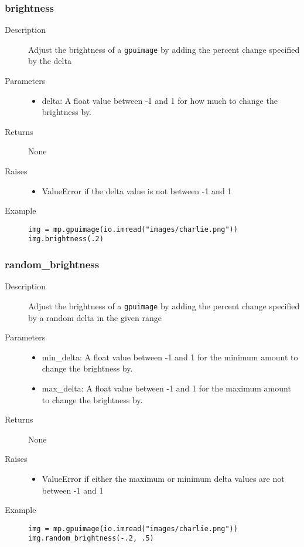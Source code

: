 \subsubsection{brightness}

\begin{description}
   \item[Description] Adjust the brightness of a \verb|gpuimage| by adding the percent change specified by the delta
   \item[Parameters] \phantom{}
   \begin{itemize}
   \item delta: A float value between -1 and 1 for how much to change the brightness by. 
   \end{itemize}
   \item[Returns] None
   \item[Raises] \phantom{}
   \begin{itemize}
       \item ValueError if the delta value is not between -1 and 1 
   \end{itemize}
   \item[Example] \phantom{}
   \begin{lstlisting}
img = mp.gpuimage(io.imread("images/charlie.png"))
img.brightness(.2)
\end{lstlisting}
\end{description}

\subsubsection{random\_brightness}

\begin{description}
   \item[Description] Adjust the brightness of a \verb|gpuimage| by adding the percent change specified by a random delta in the given range
   \item[Parameters] \phantom{}
   \begin{itemize}
   \item min\_delta: A float value between -1 and 1 for the minimum amount to change the brightness by.
   \item max\_delta: A float value between -1 and 1 for the maximum amount to change the brightness by. 
   \end{itemize}
   \item[Returns] None
   \item[Raises] \phantom{}
   \begin{itemize}
       \item ValueError if either the maximum or minimum delta values are not between -1 and 1 
   \end{itemize}
   \item[Example] \phantom{}
   \begin{lstlisting}
img = mp.gpuimage(io.imread("images/charlie.png"))
img.random_brightness(-.2, .5)
\end{lstlisting}
\end{description}

